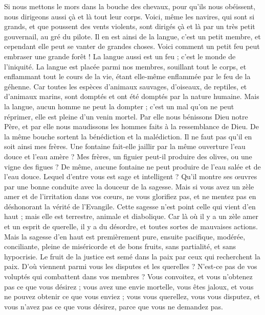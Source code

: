 \begin{multicols}{2}
Si nous mettons le mors dans la bouche des chevaux, pour qu'ils nous obéissent, nous dirigeons aussi çà et là tout leur corps.
Voici, même les navires, qui sont si grands, et que poussent des vents violents, sont dirigés çà et là par un très petit gouvernail, au gré du pilote.
Il en est ainsi de la langue, c'est un petit membre, et cependant elle peut se vanter de grandes choses. Voici comment un petit feu peut embraser une grande forêt !
La langue aussi est un feu ; c’est le monde de l’iniquité. La langue est placée parmi nos membres, souillant tout le corps, et enflammant tout le cours de la vie, étant elle-même enflammée par le feu de la géhenne.
Car toutes les espèces d’animaux sauvages, d'oiseaux, de reptiles, et d’animaux marins, sont domptés et ont été domptés par la nature humaine.
Mais la langue, aucun homme ne peut la dompter ; c'est un mal qu’on ne peut réprimer, elle est pleine d'un venin mortel.
Par elle nous bénissons Dieu notre Père, et par elle nous maudissons les hommes faits à la ressemblance de Dieu.
De la même bouche sortent la bénédiction et la malédiction. Il ne faut pas qu’il en soit ainsi mes frères.
Une fontaine fait-elle jaillir par la même ouverture l’eau douce et l’eau amère ?
Mes frères, un figuier peut-il produire des olives, ou une vigne des figues ? De même, aucune fontaine ne peut produire de l'eau salée et de l'eau douce.
Lequel d’entre vous est sage et intelligent ? Qu’il montre ses œuvres par une bonne conduite avec la douceur de la sagesse.
Mais si vous avez un zèle amer et de l'irritation dans vos cœurs, ne vous glorifiez pas, et ne mentez pas en déshonorant la vérité de l'Evangile.
Cette sagesse n’est point celle qui vient d'en haut ; mais elle est terrestre, animale{} et diabolique.
Car là où il y a un zèle amer et un esprit de querelle, il y a du désordre, et toutes sortes de mauvaises actions.
Mais la sagesse d'en haut est premièrement pure, ensuite pacifique, modérée, conciliante, pleine de miséricorde et de bons fruits, sans partialité, et sans hypocrisie.
Le fruit de la justice est semé dans la paix par ceux qui recherchent la paix.
\VerseOne{}D'où viennent parmi vous les disputes et les querelles ? N’est-ce pas de vos voluptés qui combattent dans vos membres ?
Vous convoitez, et vous n’obtenez pas ce que vous désirez ; vous avez une envie mortelle, vous êtes jaloux, et vous ne pouvez obtenir ce que vous enviez ; vous vous querellez, vous vous disputez, et vous n'avez pas ce que vous désirez, parce que vous ne demandez pas.

\end{multicols}
